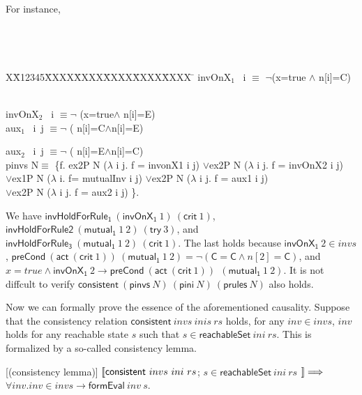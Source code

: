 \documentclass{llncs}
\newlength{\fminilength}
\newenvironment{fmini}[1][\linewidth]
  {\setlength{\fminilength}{#1\fboxsep-2\fboxrule}%
   \vspace{2ex}\noindent\begin{lrbox}{\fminibox}\begin{minipage}{\fminilength}%
   \mbox{ }\hfill\vspace{-2.5ex}}%
  {\end{minipage}\end{lrbox}\vspace{1ex}\hspace{0ex}%
   \framebox{\usebox{\fminibox}}}
\newenvironment{specification}
{\noindent\scriptsize
\tt\begin{fmini}\begin{tabbing}X\=X12345\=XXXX\=XXXX\=XXXX\=XXXX\=XXXX
\=\+\kill} {\end{tabbing}\normalfont\end{fmini}}
\begin{document}
For instance,

\begin{specification}
invOnX$_1$ ~i $\equiv$ $\neg$(x=true $\wedge$ n[i]=C)   \ \ \

invOnX$_2$ ~i $\equiv \neg$ (x=true$\wedge$ n[i]=E)  \\


aux$_1$ ~i~j $\equiv \neg$ ( n[i]=C$\wedge$n[i]=E)   \ \ \

aux$_2$ ~i~j $\equiv \neg$  ( n[i]=E$\wedge$n[i]=C)\\

  pinvs N$\equiv$ \{f. ex2P N ($\lambda$ i j.  f = invonX1 i j) $\vee$ex2P N ($\lambda$ i j.  f = invOnX2 i j)   \\
$\vee$ex1P N ($\lambda$ i.  f= mutualInv i j)    $\vee$ex2P N ($\lambda$ i j.  f =  aux1 i j) \\
$\vee$ex2P N ($\lambda$ i j.  f =  aux2 i j) \}.

\end{specification}

We have  $\mathsf{invHoldForRule_1 }~(\mathsf{invOnX_1} ~1)~
(\mathsf{crit}~1)$, $\mathsf{invHoldForRule2 }~(\mathsf{mutual_1}
~1~2)~ (\mathsf{try}~3)$,
 and $\mathsf{invHoldForRule_3 }~(\mathsf{mutual_1} ~1~2)~ (\mathsf{crit}~1)$.
 The last holds because
 $\mathsf{invOnX_1} ~2 \in invs$, $\mathsf{preCond}~(\mathsf{act}~(\mathsf{crit}~1))~
 (\mathsf{mutual_1} ~1~2)=\neg (\mathsf{C}=\mathsf{C}\wedge n[2]=\mathsf{C})$,
 and $ x=true \wedge \mathsf{invOnX_1}~2 \longrightarrow \mathsf{preCond}~
 (\mathsf{act}~(\mathsf{crit}~1))~~(\mathsf{mutual_1}
 ~1~2)$. It is not diffcult to verify
$\mathsf{consistent}~ (\mathsf{pinvs}~ N) ~(\mathsf{pini}~N)~
(\mathsf{prules}~N)$ also holds.



Now we can formally prove the essence of the aforementioned
causality. Suppose that the consistency relation
$\mathsf{consistent}~ invs ~inis~ rs$ holds, for any $inv \in invs$,
$inv$ holds for any reachable state $s$ such that $s  \in
\mathsf{reachableSet}~ ini~ rs$. This is formalized by a so-called
consistency lemma.

\begin{lemma}\label{consistentLemma}[(consistency lemma)]
  $\emph{$\mathopen{\lbrack\mkern-3mu\lbrack}$} \mathsf{consistent}~ invs ~ini~ rs$; $s  \in \mathsf{reachableSet}~ ini~ rs$
  $\emph{$\mathclose{\rbrack\mkern-3mu\rbrack}$}\Longrightarrow$ $\forall inv. inv \in invs \longrightarrow
\mathsf{formEval}~ inv ~s$.
\end{lemma}
\end{document}
